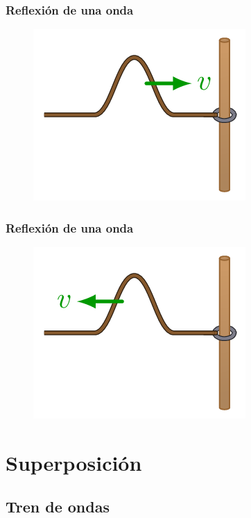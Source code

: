 \documentclass[14pt]{beamer}
\begin{document}
\begin{frame}
\frametitle{Reflexión de una onda}
\begin{figure}
    \centering
    \includegraphics[scale=0.7]{Imagenes/Reflexion_Ondas_03.png}
\end{figure}
\end{frame}
\begin{frame}
\frametitle{Reflexión de una onda}
\begin{figure}
    \centering
    \includegraphics[scale=0.7]{Imagenes/Reflexion_Ondas_04.png}
\end{figure}
\end{frame}

\section{Superposición}
\subsection{Tren de ondas}
\end{document}
